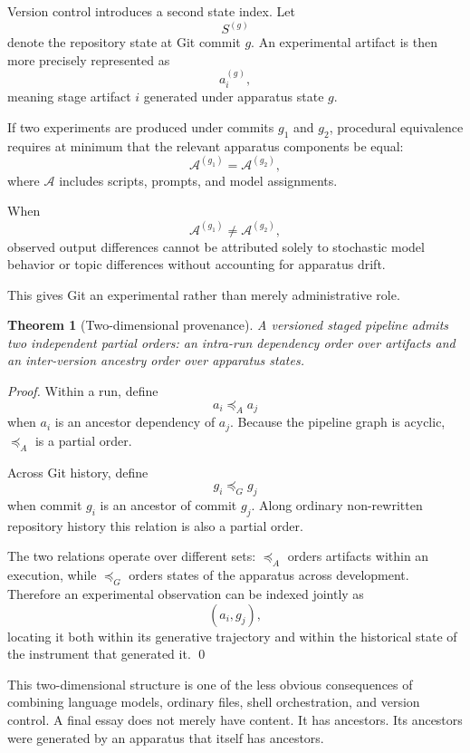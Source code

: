 \documentclass[11pt]{article}
\newtheorem{theorem}[definition]{Theorem}
\begin{document}
Version control introduces a second state index. Let
\[
    S^{(g)}
\]
denote the repository state at Git commit \(g\). An experimental artifact is then more precisely represented as
\[
    a_{i}^{(g)},
\]
meaning stage artifact \(i\) generated under apparatus state \(g\).

If two experiments are produced under commits \(g_1\) and \(g_2\), procedural equivalence requires at minimum that the relevant apparatus components be equal:
\[
    \mathcal{A}^{(g_1)}
    =
    \mathcal{A}^{(g_2)},
\]
where \(\mathcal{A}\) includes scripts, prompts, and model assignments.

When
\[
    \mathcal{A}^{(g_1)}
    \neq
    \mathcal{A}^{(g_2)},
\]
observed output differences cannot be attributed solely to stochastic model behavior or topic differences without accounting for apparatus drift.

This gives Git an experimental rather than merely administrative role.

\begin{theorem}[Two-dimensional provenance]
A versioned staged pipeline admits two independent partial orders: an intra-run dependency order over artifacts and an inter-version ancestry order over apparatus states.
\end{theorem}

\begin{proof}
Within a run, define
\[
    a_i\preceq_A a_j
\]
when \(a_i\) is an ancestor dependency of \(a_j\). Because the pipeline graph is acyclic, \(\preceq_A\) is a partial order.

Across Git history, define
\[
    g_i\preceq_G g_j
\]
when commit \(g_i\) is an ancestor of commit \(g_j\). Along ordinary non-rewritten repository history this relation is also a partial order.

The two relations operate over different sets: \(\preceq_A\) orders artifacts within an execution, while \(\preceq_G\) orders states of the apparatus across development. Therefore an experimental observation can be indexed jointly as
\[
    (a_i,g_j),
\]
locating it both within its generative trajectory and within the historical state of the instrument that generated it. \qed
\end{proof}

This two-dimensional structure is one of the less obvious consequences of combining language models, ordinary files, shell orchestration, and version control. A final essay does not merely have content. It has ancestors. Its ancestors were generated by an apparatus that itself has ancestors.
\end{document}
